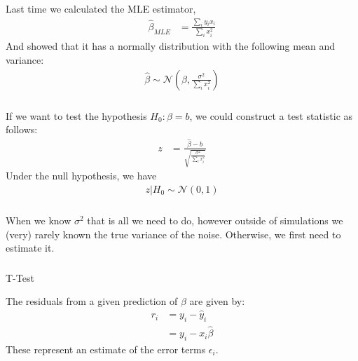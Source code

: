 \begin{frame}[fragile] \frametitle{}

Last time we calculated the MLE estimator,
\begin{align*}
\widehat{\beta}_{MLE} &= \frac{\sum_i y_i x_i}{\sum_i x_i^2}
\end{align*}
And showed that it has a normally distribution with the following
mean and variance:
\begin{align*}
\widehat{\beta} \sim \mathcal{N} (\beta, \frac{\sigma^2}{\sum_i x_i^2})
\end{align*}

\end{frame}

\begin{frame}[fragile] \frametitle{}

If we want to test the hypothesis $H_0: \beta = b$, we
could construct a test statistic as follows: \pause
\begin{align*}
z &= \frac{\widehat{\beta} - b}{\sqrt{\frac{\sigma^2}{\sum_i x_i^2}}}
\end{align*}
\pause Under the null hypothesis, we have
\begin{align*}
z | H_0  \sim \mathcal{N} (0, 1)
\end{align*}

\end{frame}

\begin{frame}[fragile] \frametitle{}

When we know $\sigma^2$ that is all we need to do, however
outside of simulations we (very) rarely known the true variance
of the noise. Otherwise, we first need to estimate it.

\end{frame}

\begin{frame}[fragile] \frametitle{}

{\color{yaleblue}\fontsize{16pt}{20pt}\selectfont T-Test}

The residuals from a given prediction of $\beta$ are given by:
\begin{align*}
r_i &= y_i - \widehat{y}_i \\
&= y_i - x_i \widehat{\beta}
\end{align*}
These represent an estimate of the error terms $\epsilon_i$.

\end{frame}

